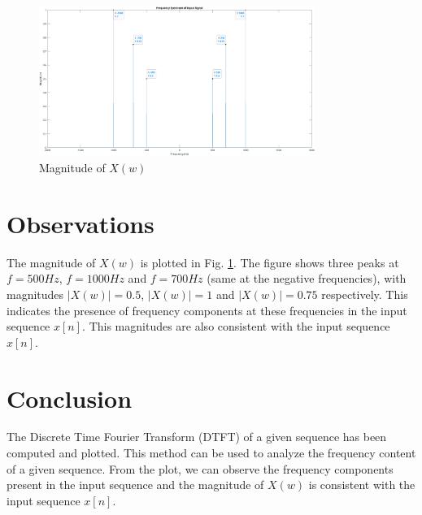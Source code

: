 \documentclass[a4paper,12pt]{article}
\begin{document}
\begin{figure}[ht]
    \centering
    \includegraphics[width=0.8\textwidth]{./figs/dtft.png}
    \caption{Magnitude of $X(w)$}
    \label{fig:dtft}
\end{figure}

\section*{Observations}
The magnitude of $X(w)$ is plotted in Fig. \ref{fig:dtft}.
 The figure shows three peaks at $f = 500 Hz$, $f = 1000 Hz$ and $f = 700 Hz$ (same at the negative frequencies),
 with magnitudes $|X(w)| = 0.5$, $|X(w)| = 1$ and $|X(w)| = 0.75$ respectively. This indicates the presence of frequency components at these frequencies in the input sequence $x[n]$.
 This magnitudes are also consistent with the input sequence $x[n]$.

\section*{Conclusion}
The Discrete Time Fourier Transform (DTFT) of a given sequence has been computed and plotted.
 This method can be used to analyze the frequency content of a given sequence.
 From the plot, we can observe the frequency components present in the input sequence and the 
 magnitude of $X(w)$ is consistent with the input sequence $x[n]$.
\end{document}
